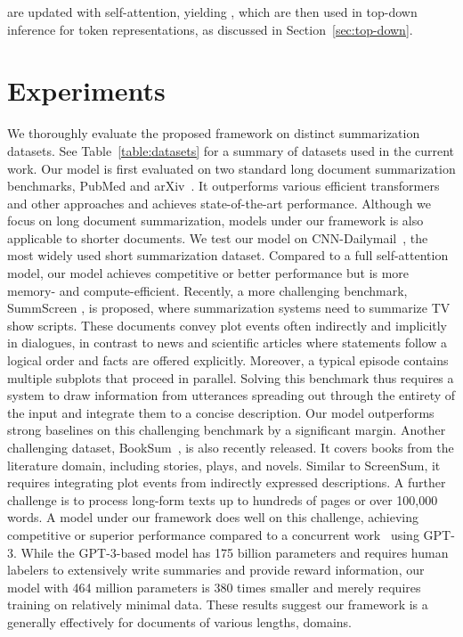 \documentclass{article} \usepackage{iclr2022_conference,times}
\begin{document}
 are updated with self-attention, yielding , which are then used in top-down inference for token representations, as discussed in Section~\ref{sec:top-down}. 

\section{Experiments}

We thoroughly evaluate the proposed framework on distinct summarization datasets. See Table~\ref{table:datasets} for a summary of datasets used in the current work. Our model is first evaluated on two standard long document summarization benchmarks, PubMed and arXiv~\citep{cohan-etal-2018-discourse}. It outperforms various efficient transformers and other approaches and achieves state-of-the-art performance. Although we focus on long document summarization, models under our framework is also applicable to shorter documents. We test our model on CNN-Dailymail~\citep{see-etal-2017-get}, the most widely used short summarization dataset. Compared to a full self-attention model, our model achieves competitive or better performance but is more memory- and compute-efficient. Recently, a more challenging benchmark, SummScreen \citep{chen2021summscreen}, is proposed, where summarization systems need to summarize TV show scripts. These documents convey plot events often indirectly and implicitly in dialogues, in contrast to news and scientific articles where statements follow a logical order and facts are offered explicitly. Moreover, a typical episode contains multiple subplots that proceed in parallel. Solving this benchmark thus requires a system to draw information from utterances spreading out through the entirety of the input and integrate them to a concise description. Our model outperforms strong baselines on this challenging benchmark by a significant margin. Another challenging dataset, BookSum~\citep{kryscinski2021booksum}, is also recently released. It covers books from the literature domain, including stories, plays, and novels. Similar to ScreenSum, it requires integrating plot events from indirectly expressed descriptions. A further challenge is to process long-form texts up to hundreds of pages or over 100,000 words. A model under our framework does well on this challenge, achieving competitive or superior performance compared to a concurrent work~\citep{wu2021recursively} using GPT-3. While the GPT-3-based model has 175 billion parameters and requires human labelers to extensively write summaries and provide reward information, our model with 464 million parameters is 380 times smaller and merely requires training on relatively minimal data. These results suggest our framework is a generally effectively for documents of various lengths, domains. 
\end{document}
